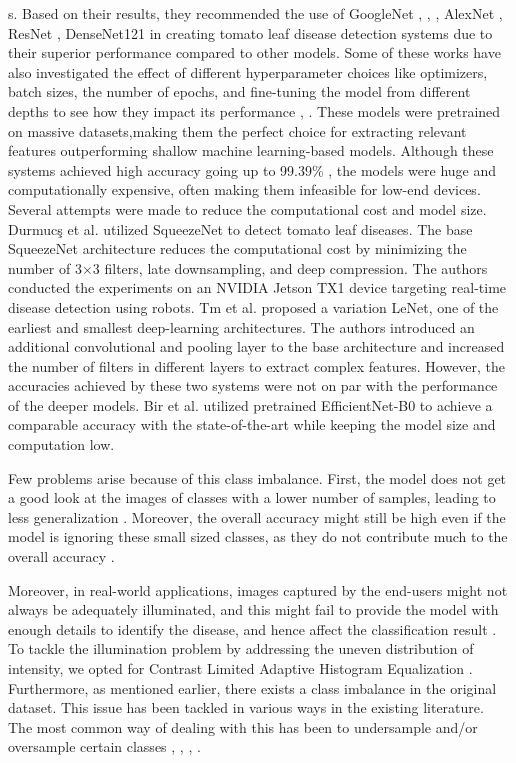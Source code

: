 \documentclass[a4paper,10pt]{article}
\begin{document}
s. Based on their results, they recommended the use
of GoogleNet \cite{37}, \cite{40}, \cite{41}, AlexNet \cite{42}, ResNet \cite{43},
DenseNet121 \cite{44} in creating tomato leaf disease detection systems due to their superior performance compared to other
models. Some of these works have also investigated the effect of different hyperparameter choices like optimizers, batch sizes, the number of epochs, and fine-tuning the model from different depths to see how they impact its performance \cite{40},
\cite{42}. These models were pretrained on massive datasets,making them the perfect choice for extracting relevant features outperforming shallow machine learning-based models.
Although these systems achieved high accuracy going up to 99.39\% \cite{40}, the models were huge and computationally expensive, often making them infeasible for low-end devices.
Several attempts were made to reduce the computational cost and model size. Durmucş et al. \cite{45} utilized SqueezeNet
to detect tomato leaf diseases. The base SqueezeNet architecture reduces the computational cost by minimizing the number of 3×3 filters, late downsampling, and deep compression.
The authors conducted the experiments on an NVIDIA Jetson TX1 device targeting real-time disease detection using robots.
Tm et al. \cite{46} proposed a variation LeNet, one of the earliest and smallest deep-learning architectures. The authors introduced an additional convolutional and pooling layer to the
base architecture and increased the number of filters in different layers to extract complex features. However, the accuracies achieved by these two systems were not on par with
the performance of the deeper models. Bir et al. \cite{47} utilized pretrained EfficientNet-B0 to achieve a comparable accuracy
with the state-of-the-art while keeping the model size and computation low.

 Few problems arise because of this class
imbalance. First, the model does not get a good look at the images of classes with a lower number of samples, leading
to less generalization \cite{48}. Moreover, the overall accuracy
might still be high even if the model is ignoring these small sized classes, as they do not contribute much to the overall
accuracy \cite{49}. 

Moreover, in real-world applications,
images captured by the end-users might not always be adequately illuminated, and this might fail to provide the model
with enough details to identify the disease, and hence affect
the classification result \cite{50}.
To tackle the illumination problem by addressing the uneven
distribution of intensity, we opted for Contrast Limited Adaptive Histogram Equalization \cite{51}.
Furthermore, as mentioned earlier, there exists a class imbalance in the original dataset. This issue has been tackled in various ways in the existing literature. The most common way of dealing with this has been to undersample and/or oversample certain classes \cite{41}, \cite{43}, \cite{44}, \cite{47}.
\end{document}
